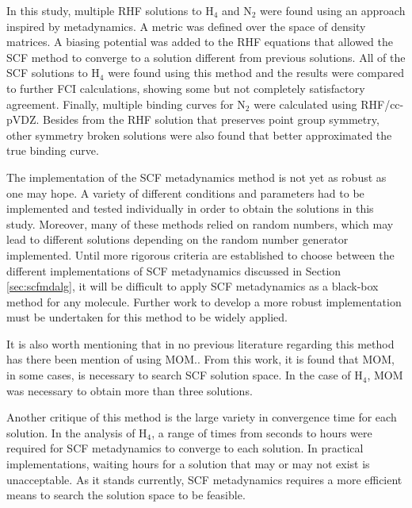 \documentclass[final,3p,times,twocolumn]{elsarticle}
\begin{document}
In this study, multiple RHF solutions to H$_4$ and N$_2$ were found using an approach inspired by metadynamics. A metric was defined over the space of density matrices. A biasing potential was added to the RHF equations that allowed the SCF method to converge to a solution different from previous solutions. All of the SCF solutions to H$_4$ were found using this method and the results were compared to further FCI calculations, showing some but not completely satisfactory agreement. Finally, multiple binding curves for N$_2$ were calculated using RHF/cc-pVDZ. Besides from the RHF solution that preserves point group symmetry, other symmetry broken solutions were also found that better approximated the true binding curve.

The implementation of the SCF metadynamics method is not yet as robust as one may hope. A variety of different conditions and parameters had to be implemented and tested individually in order to obtain the solutions in this study. Moreover, many of these methods relied on random numbers, which may lead to different solutions depending on the random number generator implemented. Until more rigorous criteria are established to choose between the different implementations of SCF metadynamics discussed in Section \ref{sec:scfmdalg}, it will be difficult to apply SCF metadynamics as a black-box method for any molecule. Further work to develop a more robust implementation must be undertaken for this method to be widely applied.

It is also worth mentioning that in no previous literature regarding this method has there been mention of using MOM.\cite{scfmd,thom-2009}. From this work, it is found that MOM, in some cases, is necessary to search SCF solution space. In the case of H$_4$, MOM was necessary to obtain more than three solutions.

Another critique of this method is the large variety in convergence time for each solution. In the analysis of H$_4$, a range of times from seconds to hours were required for SCF metadynamics to converge to each solution. In practical implementations, waiting hours for a solution that may or may not exist is unacceptable. As it stands currently, SCF metadynamics requires a more efficient means to search the solution space to be feasible.
\end{document}
